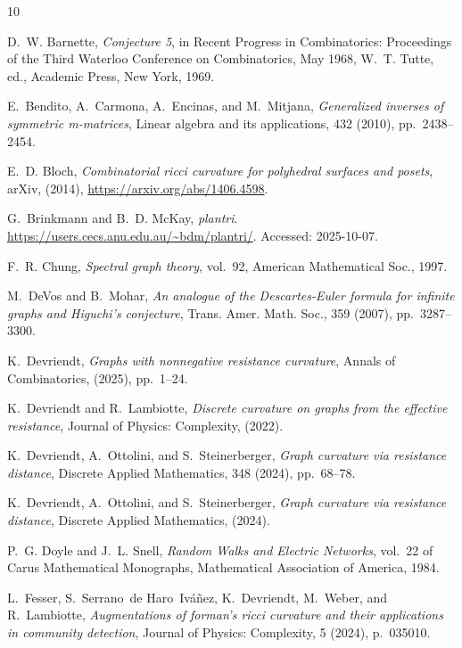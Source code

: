 \documentclass[11pt,a4paper]{amsart}
\begin{document}
\begin{thebibliography}{10}

{\sc D.~W. Barnette}, {\em Conjecture 5}, in Recent Progress in Combinatorics: Proceedings of the Third Waterloo Conference on Combinatorics, May 1968, W.~T. Tutte, ed., Academic Press, New York, 1969.

{\sc E.~Bendito, A.~Carmona, A.~Encinas, and M.~Mitjana}, {\em Generalized inverses of symmetric m-matrices}, Linear algebra and its applications, 432 (2010), pp.~2438--2454.

{\sc E.~D. Bloch}, {\em Combinatorial ricci curvature for polyhedral surfaces and posets}, arXiv,  (2014), \url{https://arxiv.org/abs/1406.4598}.

{\sc G.~Brinkmann and B.~D. McKay}, {\em plantri}.
\newblock \url{https://users.cecs.anu.edu.au/~bdm/plantri/}.
\newblock Accessed: 2025-10-07.

{\sc F.~R. Chung}, {\em Spectral graph theory}, vol.~92, American Mathematical Soc., 1997.

{\sc M.~DeVos and B.~Mohar}, {\em An analogue of the {D}escartes-{E}uler formula for infinite graphs and {H}iguchi's conjecture}, Trans. Amer. Math. Soc., 359 (2007), pp.~3287--3300.

{\sc K.~Devriendt}, {\em Graphs with nonnegative resistance curvature}, Annals of Combinatorics,  (2025), pp.~1--24.

{\sc K.~Devriendt and R.~Lambiotte}, {\em Discrete curvature on graphs from the effective resistance}, Journal of Physics: Complexity,  (2022).

{\sc K.~Devriendt, A.~Ottolini, and S.~Steinerberger}, {\em Graph curvature via resistance distance}, Discrete Applied Mathematics, 348 (2024), pp.~68--78.

{\sc K.~Devriendt, A.~Ottolini, and S.~Steinerberger}, {\em Graph curvature via resistance distance}, Discrete Applied Mathematics,  (2024).

{\sc P.~G. Doyle and J.~L. Snell}, {\em Random Walks and Electric Networks}, vol.~22 of Carus Mathematical Monographs, Mathematical Association of America, 1984.

{\sc L.~Fesser, S.~Serrano~de Haro~Iváñez, K.~Devriendt, M.~Weber, and R.~Lambiotte}, {\em Augmentations of forman's ricci curvature and their applications in community detection}, Journal of Physics: Complexity, 5 (2024), p.~035010.


\end{thebibliography}
\end{document}
